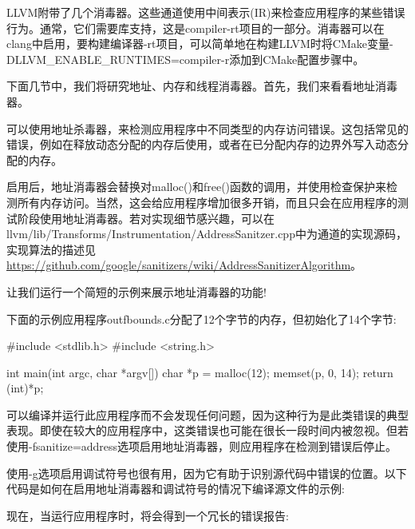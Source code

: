 
LLVM附带了几个消毒器。这些通道使用中间表示(IR)来检查应用程序的某些错误行为。通常，它们需要库支持，这是compiler-rt项目的一部分。消毒器可以在clang中启用，要构建编译器-rt项目，可以简单地在构建LLVM时将CMake变量-DLLVM\_ENABLE\_RUNTIMES=compiler-r添加到CMake配置步骤中。

下面几节中，我们将研究地址、内存和线程消毒器。首先，我们来看看地址消毒器。


可以使用地址杀毒器，来检测应用程序中不同类型的内存访问错误。这包括常见的错误，例如在释放动态分配的内存后使用，或者在已分配内存的边界外写入动态分配的内存。

启用后，地址消毒器会替换对malloc()和free()函数的调用，并使用检查保护来检测所有内存访问。当然，这会给应用程序增加很多开销，而且只会在应用程序的测试阶段使用地址消毒器。若对实现细节感兴趣，可以在llvm/lib/Transforms/Instrumentation/AddressSanitzer.cpp中为通道的实现源码，实现算法的描述见\url{https://github.com/google/sanitizers/wiki/AddressSanitizerAlgorithm}。

让我们运行一个简短的示例来展示地址消毒器的功能!

下面的示例应用程序outfbounds.c分配了12个字节的内存，但初始化了14个字节:

\begin{cpp}
#include <stdlib.h>
#include <string.h>

int main(int argc, char *argv[]) {
    char *p = malloc(12);
    memset(p, 0, 14);
    return (int)*p;
}
\end{cpp}

可以编译并运行此应用程序而不会发现任何问题，因为这种行为是此类错误的典型表现。即使在较大的应用程序中，这类错误也可能在很长一段时间内被忽视。但若使用-fsanitize=address选项启用地址消毒器，则应用程序在检测到错误后停止。

使用-g选项启用调试符号也很有用，因为它有助于识别源代码中错误的位置。以下代码是如何在启用地址消毒器和调试符号的情况下编译源文件的示例:


现在，当运行应用程序时，将会得到一个冗长的错误报告:


